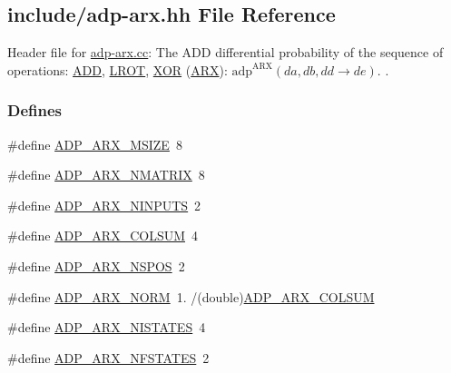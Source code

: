 \hypertarget{adp-arx_8hh}{\subsection{include/adp-\/arx.hh \-File \-Reference}
\label{adp-arx_8hh}
}


\-Header file for \hyperlink{adp-arx_8cc}{adp-\/arx.\-cc}\-: \-The \-A\-D\-D differential probability of the sequence of operations\-: \hyperlink{common_8hh_af3b709fb668cf93ca09e2a46a2a031a8}{\-A\-D\-D}, \hyperlink{common_8hh_abe2030c44a97657e1b1dbe9b0e093a7b}{\-L\-R\-O\-T}, \hyperlink{common_8hh_a6de9ec3b3b57377b69a82239ea52ec6e}{\-X\-O\-R} (\hyperlink{common_8hh_a7d3da57c58af293c7c57e4f1b551849d}{\-A\-R\-X})\-: $\mathrm{adp}^{\mathrm{ARX}}(da,db,dd \rightarrow de)$. .  


\subsubsection*{\-Defines}
\begin{DoxyCompactItemize}
\item 
\#define \hyperlink{adp-arx_8hh_af665f75e00f5755b68319f5907f75823}{\-A\-D\-P\-\_\-\-A\-R\-X\-\_\-\-M\-S\-I\-Z\-E}~8
\item 
\#define \hyperlink{adp-arx_8hh_af6f580b310ea3dec4a6610596a4ad658}{\-A\-D\-P\-\_\-\-A\-R\-X\-\_\-\-N\-M\-A\-T\-R\-I\-X}~8
\item 
\#define \hyperlink{adp-arx_8hh_a41f017d072231a64ea971421941d6d75}{\-A\-D\-P\-\_\-\-A\-R\-X\-\_\-\-N\-I\-N\-P\-U\-T\-S}~2
\item 
\#define \hyperlink{adp-arx_8hh_a116dbb7b7f9b74d35cb3552cd8b009b9}{\-A\-D\-P\-\_\-\-A\-R\-X\-\_\-\-C\-O\-L\-S\-U\-M}~4
\item 
\#define \hyperlink{adp-arx_8hh_a50a0dcf2c43a4931b06ca4d676a6c8a7}{\-A\-D\-P\-\_\-\-A\-R\-X\-\_\-\-N\-S\-P\-O\-S}~2
\item 
\#define \hyperlink{adp-arx_8hh_aa9ce73d4aea6f8e57ab8d984483e61ad}{\-A\-D\-P\-\_\-\-A\-R\-X\-\_\-\-N\-O\-R\-M}~1. /(double)\hyperlink{adp-arx_8hh_a116dbb7b7f9b74d35cb3552cd8b009b9}{\-A\-D\-P\-\_\-\-A\-R\-X\-\_\-\-C\-O\-L\-S\-U\-M}
\item 
\#define \hyperlink{adp-arx_8hh_af9236f8d08a54b97ed2199271de979f6}{\-A\-D\-P\-\_\-\-A\-R\-X\-\_\-\-N\-I\-S\-T\-A\-T\-E\-S}~4
\item 
\#define \hyperlink{adp-arx_8hh_a233a0b6f32ce3bbaac71e99d06e26e1d}{\-A\-D\-P\-\_\-\-A\-R\-X\-\_\-\-N\-F\-S\-T\-A\-T\-E\-S}~2
\end{DoxyCompactItemize}
